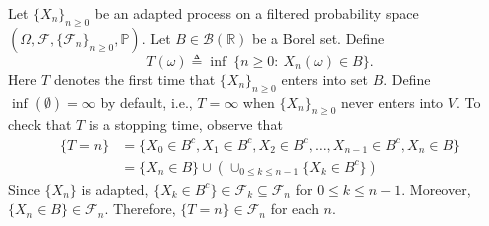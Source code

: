 \begin{example}
Let $\{X_n\}_{n\ge0}$ be an adapted process on a filtered probability space 
$(\Omega,\mathcal{F},\{\mathcal{F}_n\}_{n\ge0},\mathbb{P})$.
Let $B\in\mathcal{B}(\mathbb{R})$ be a Borel set.
Define
\[
T(\omega)\triangleq \inf~\{n\ge0:~X_n(\omega)\in B\}.
\]
Here $T$ denotes the first time that $\{X_n\}_{n\ge0}$ enters into set $B$.
Define $\inf(\emptyset)=\infty$ by default, i.e., $T=\infty$ when $\{X_n\}_{n\ge0}$ never enters into $V$.
To check that $T$ is a stopping time, observe that 
\begin{align*}
\{T=n\}&=\{X_0\in B^c,X_1\in B^c,X_2\in B^c,\ldots,X_{n-1}\in B^c, X_n\in B\}
\\&=
\{X_n\in B\}\cup\left(
\cup_{0\le k\le n-1}\{X_k\in B^c\}\right)
\end{align*}
Since $\{X_n\}$ is adapted, $\{X_k\in B^c\}\in\mathcal{F}_k\subseteq\mathcal{F}_n$ for $0\le k\le n-1$. Moreover, $\{X_n\in B\}\in\mathcal{F}_n$.
Therefore, $\{T=n\}\in\mathcal{F}_n$ for each $n$.


\end{example}

